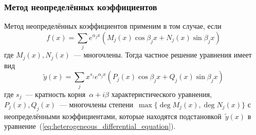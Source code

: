 \subsubsection{Метод неопределённых коэффициентов}
 Метод неопределённых коэффициентов применим в том случае, если
\begin{equation*}
f(x) = \sum_j e^{\alpha_j x} (M_j(x) \cos \beta_j x + N_j(x) \sin \beta_j x)
\end{equation*}
где $M_j(x), N_j(x)$~--- многочлены.
Тогда частное решение уравнения имеет вид
\begin{equation*}
\tilde y(x) = \sum_j x^{s_j} e^{\alpha_j x} (P_j(x) \cos \beta_j x + Q_j(x) \sin \beta_j x)
\end{equation*}
где $s_j$~--- кратность корня~$\alpha + i \beta$ характеристического уравнения, $P_j(x), Q_j(x)$~--- многочлены степени~$\max \{ \deg M_j(x), \allowbreak \deg N_j(x) \}$ с неопределёнными коэффициентами, которые находятся подстановкой~$\tilde y(x)$ в уравнение~(\ref*{eq:heterogeneous_differential_equation}).